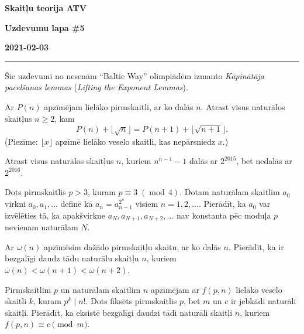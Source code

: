 \documentclass[a4paper,12pt]{article}
\begin{document}
\begin{center}
\parbox{3.5cm}{\flushleft\bf Skaitļu teorija \newline ATV} \hfill {\bf\LARGE Uzdevumu lapa \#5} \hfill \parbox{3.5cm}{\flushright\bf 2021-02-03} %
\end{center}

\hrule



Šie uzdevumi no nesenām ``Baltic Way'' olimpiādēm 
izmanto {\em Kāpinātāja pacelšanas lemmas} ({\em Lifting the Exponent Lemmas}).


\vspace{10pt}
\begin{problem}
Ar $P(n)$ apzīmējam lielāko pirmskaitli, ar ko dalās $n$. Atrast visus
naturālos skaitļus $n \geq 2$, kam
\[ P(n) + \lfloor \sqrt{n} \rfloor = P(n+1) + \lfloor \sqrt{n+1} \rfloor. \]
(Piezīme: $\lfloor x \rfloor$ apzīmē lielāko veselo skaitli, kas nepārsniedz $x$.)
\end{problem}


\vspace{10pt}
\begin{problem}
Atrast visus naturālos skaitļus $n$, kuriem $n^{n-1} - 1$ dalās ar $2^{2015}$,
bet nedalās ar $2^{2016}$.
\end{problem}


\vspace{10pt}
\begin{problem}
Dots pirmskaitlis $p > 3$, kuram $p \equiv 3\;(\operatorname{mod}\,4)$.
Dotam naturālam skaitlim $a_0$ virkni
$a_0, a_1, \ldots$ definē kā $a_n = a^{2^n}_{n-1}$ visiem
$n = 1, 2, \ldots$. Pierādīt, ka $a_0$ var izvēlēties tā, ka
apakšvirkne $a_N, a_{N+1}, a_{N+2}, \ldots$
nav konstanta pēc moduļa $p$ nevienam naturālam $N$.
\end{problem}


\vspace{10pt}
\begin{problem}
Ar $\omega(n)$ apzīmēsim dažādo pirmskaitļu skaitu, ar ko dalās $n$. Pierādīt, ka ir bezgalīgi
daudz tādu naturālu skaitļu $n$, kuriem $\omega(n) < \omega(n+1) < \omega(n+2)$.
\end{problem}


\vspace{10pt}
\begin{problem}
Pirmskaitlim $p$ un naturālam skaitlim $n$ apzīmējam 
ar $f(p, n)$ lielāko veselo skaitli $k$, kuram $p^k \mid n!$. 
Dots fiksēts pirmskaitlis $p$, bet $m$ un $c$ ir jebkādi naturāli skaitļi. 
Pierādīt, ka eksistē bezgalīgi daudzi tādi naturāli skaitļi $n$, kuriem 
$f(p, n) \equiv c \pmod m$.
\end{problem}
\end{document}
